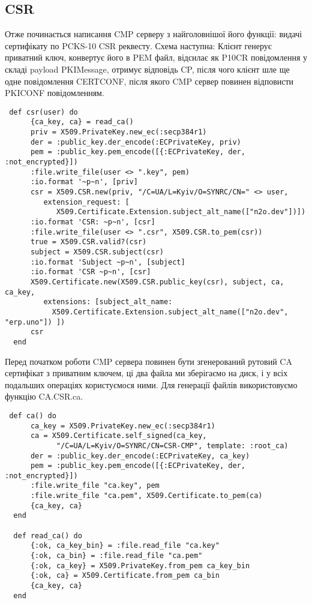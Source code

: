 \newpage
\subsection{CSR}

Отже починається написання CMP серверу з найголовнішої його функції: видачі сертифікату по PCKS-10 CSR реквесту. Схема наступна: Клієнт генерує приватний ключ, конвертує його в PEM файл, відсилає як P10CR повідомлення у складі payload PKIMessage, отримує відповідь CP, після чого клієнт шле ще одне повідомлення CERTCONF, після якого CMP сервер повинен відповисти PKICONF повідомленням.


\begin{lstlisting}
 def csr(user) do
      {ca_key, ca} = read_ca()
      priv = X509.PrivateKey.new_ec(:secp384r1)
      der = :public_key.der_encode(:ECPrivateKey, priv)
      pem = :public_key.pem_encode([{:ECPrivateKey, der, :not_encrypted}])
      :file.write_file(user <> ".key", pem)
      :io.format '~p~n', [priv]
      csr = X509.CSR.new(priv, "/C=UA/L=Kyiv/O=SYNRC/CN=" <> user,
         extension_request: [
            X509.Certificate.Extension.subject_alt_name(["n2o.dev"])])
      :io.format 'CSR: ~p~n', [csr]
      :file.write_file(user <> ".csr", X509.CSR.to_pem(csr))
      true = X509.CSR.valid?(csr)
      subject = X509.CSR.subject(csr)
      :io.format 'Subject ~p~n', [subject]
      :io.format 'CSR ~p~n', [csr]
      X509.Certificate.new(X509.CSR.public_key(csr), subject, ca, ca_key,
         extensions: [subject_alt_name:
           X509.Certificate.Extension.subject_alt_name(["n2o.dev", "erp.uno"]) ])
      csr
  end
\end{lstlisting}

\newpage
Перед початком роботи CMP сервера повинен бути згенерований рутовий CA сертифікат з приватним ключем, ці два файла ми зберігаємо на диск, і у всіх подальших операціях користуємося ними. Для генерації файлів використовуємо функцію CA.CSR.ca.

\begin{lstlisting}
 def ca() do
      ca_key = X509.PrivateKey.new_ec(:secp384r1)
      ca = X509.Certificate.self_signed(ca_key,
            "/C=UA/L=Kyiv/O=SYNRC/CN=CSR-CMP", template: :root_ca)
      der = :public_key.der_encode(:ECPrivateKey, ca_key)
      pem = :public_key.pem_encode([{:ECPrivateKey, der, :not_encrypted}])
      :file.write_file "ca.key", pem
      :file.write_file "ca.pem", X509.Certificate.to_pem(ca)
      {ca_key, ca}
  end

  def read_ca() do
      {:ok, ca_key_bin} = :file.read_file "ca.key"
      {:ok, ca_bin} = :file.read_file "ca.pem"
      {:ok, ca_key} = X509.PrivateKey.from_pem ca_key_bin
      {:ok, ca} = X509.Certificate.from_pem ca_bin
      {ca_key, ca}
  end
\end{lstlisting}


